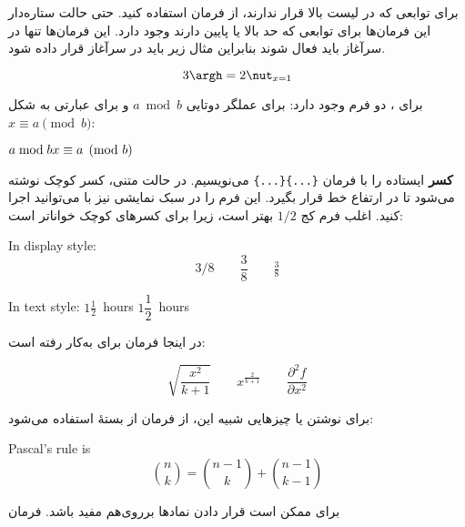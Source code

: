 برای توابعی که در لیست بالا قرار ندارند، از فرمان 
استفاده کنید. حتی حالت ستاره‌دار این فرمان‌ها برای توابعی که حد بالا یا پایین دارند وجود دارد. این فرمان‌ها تنها در سر‌آغاز باید فعال شوند بنابراین مثال زیر باید در سرآغاز قرار داده شود.
\begin{example}
\[3\argh = 2\nut_{x=1}\]
\end{example}
برای ، دو فرم وجود دارد:  برای عملگر دوتایی $a \bmod b$ و   برای عبارتی به شکل  $x\equiv a \pmod{b}$:
\begin{example}
$a\bmod b \\
 x\equiv a \pmod{b}$
\end{example}

\textbf{کسر}
ایستاده را با فرمان \verb|{...}{...}| می‌نویسیم. در حالت متنی، کسر کوچک نوشته می‌شود تا در ارتفاع خط قرار بگیرد. این فرم را در سبک نمایشی نیز با   می‌توانید اجرا کنید. اغلب فرم کج 
$1/2$ بهتر است، زیرا برای کسرهای کوچک خواناتر است:

\begin{example}
In display style:
\[3/8 \qquad \frac{3}{8} 
 \qquad \tfrac{3}{8} \]
\end{example}


\begin{example}
In text style:
$1\frac{1}{2}$~hours \qquad
$1\dfrac{1}{2}$~hours
\end{example}




 
در اینجا فرمان  برای  به‌کار رفته است:
\begin{example}
\[\sqrt{\frac{x^2}{k+1}}\qquad
  x^\frac{2}{k+1}\qquad
  \frac{\partial^2f}
  {\partial x^2} \]
\end{example}

برای نوشتن   یا چیزهایی شبیه این، از فرمان   از بستۀ  استفاده می‌شود:
\begin{example}
Pascal's rule is
\begin{equation*}
 \binom{n}{k} =\binom{n-1}{k}
 + \binom{n-1}{k-1}
\end{equation*}
\end{example}

برای   ممکن است قرار دادن نمادها بر‌روی‌هم مفید باشد. فرمان

